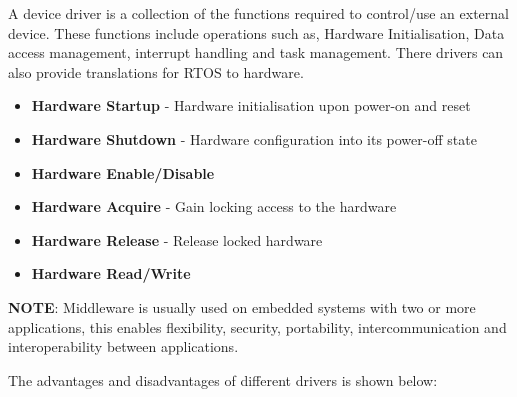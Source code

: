 A device driver is a collection of the functions required to control/use an external device. These
functions include operations such as, Hardware Initialisation, Data access management, interrupt
handling and task management. There drivers can also provide translations for RTOS to hardware.

\begin{itemize}
    \item \textbf{Hardware Startup} - Hardware initialisation upon power-on and reset
    \item \textbf{Hardware Shutdown} - Hardware configuration into its power-off state
    \item \textbf{Hardware Enable/Disable}
    \item \textbf{Hardware Acquire} - Gain locking access to the hardware
    \item \textbf{Hardware Release} - Release locked hardware
    \item \textbf{Hardware Read/Write}
\end{itemize}



\textbf{NOTE}: Middleware is usually used on embedded systems with two or more applications, this
enables flexibility, security, portability, intercommunication and interoperability between
applications.

The advantages and disadvantages of different drivers is shown below:

